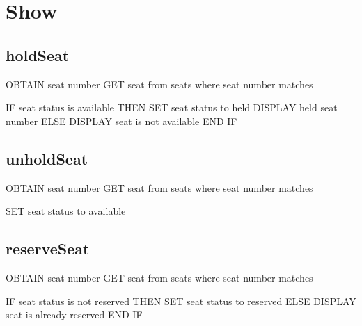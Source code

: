 \section{Show}

\subsection{holdSeat}
\begin{pc}
OBTAIN seat number
GET seat from seats where seat number matches

IF seat status is available THEN
    SET seat status to held
    DISPLAY held seat number
ELSE
    DISPLAY seat is not available
END IF
\end{pc}

\subsection{unholdSeat}
\begin{pc}
OBTAIN seat number
GET seat from seats where seat number matches

SET seat status to available
\end{pc}

\subsection{reserveSeat}
\begin{pc}
OBTAIN seat number
GET seat from seats where seat number matches

IF seat status is not reserved THEN
    SET seat status to reserved
ELSE
    DISPLAY seat is already reserved
END IF
\end{pc}
